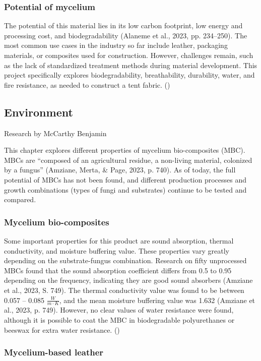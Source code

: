 \documentclass{article}
\begin{document}
\subsubsection{Potential of mycelium}
The potential of this material lies in its low carbon footprint, low
energy and processing cost, and biodegradability
(Alaneme et al., 2023, pp. 234--250). The most common use cases in the
industry so far include leather, packaging materials, or composites
used for construction. However, challenges remain, such as the lack
of standardized treatment methods during material development. This
project specifically explores biodegradability, breathability,
durability, water, and fire resistance, as needed to construct a tent
fabric. (\cite{alaneme2023})

\subsection{Environment}
{\small Research by McCarthy Benjamin}

This chapter explores different properties of mycelium bio-composites
(MBC). MBCs are ``composed of an agricultural residue, a non-living
material, colonized by a fungus'' (Amziane, Merta, \& Page, 2023, p. 740).
As of today, the full potential of MBCs has not been found, and
different production processes and growth combinations
(types of fungi and substrates) continue to be tested and compared.

\subsubsection{Mycelium bio-composites}

Some important properties for this product are sound absorption,
thermal conductivity, and moisture buffering value. These properties
vary greatly depending on the substrate-fungus combination. Research
on fifty unprocessed MBCs found that the sound absorption coefficient
differs from 0.5 to 0.95 depending on the frequency, indicating they
are good sound absorbers (Amziane et al., 2023, S. 749). The thermal
conductivity value was found to be between 0.057 -- 0.085
$\frac{W}{m\cdot K}$, and the mean moisture buffering value was
1.632 (Amziane et al., 2023, p. 749). However, no clear values of
water resistance were found, although it is possible to coat the MBC
in biodegradable polyurethanes or beeswax for extra water resistance.
(\cite{amziane2023})

\subsubsection{Mycelium-based leather}
\end{document}
